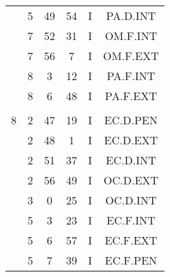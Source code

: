 \documentclass[12pt, a4paper]{article}
\begin{document}
\begin{multicols}{3}
{\begin{tabular}{c c c c c c}
	 	 	 	 & 5 & 49 & 54 & I & PA.D.INT\\%
	 	 	 	 & 7 & 52 & 31 & I & OM.F.INT\\%
	 	 	 	 & 7 & 56 & 7 & I & OM.F.EXT\\%
	 	 	 	 & 8 & 3 & 12 & I & PA.F.INT\\%
	 	 	 	 & 8 & 6 & 48 & I & PA.F.EXT\\%
	 	 	 	 & & & & & \\%
	 	 	 	8 & 2 & 47 & 19 & I & EC.D.PEN\\%
	 	 	 	 & 2 & 48 & 1 & I & EC.D.EXT\\%
	 	 	 	 & 2 & 51 & 37 & I & EC.D.INT\\%
	 	 	 	 & 2 & 56 & 49 & I & OC.D.EXT\\%
	 	 	 	 & 3 & 0 & 25 & I & OC.D.INT\\%
	 	 	 	 & 5 & 3 & 23 & I & EC.F.INT\\%
	 	 	 	 & 5 & 6 & 57 & I & EC.F.EXT\\%
	 	 	 	 & 5 & 7 & 39 & I & EC.F.PEN\\%
	 	 \end{tabular}
 	}
\end{multicols}
\end{document}
